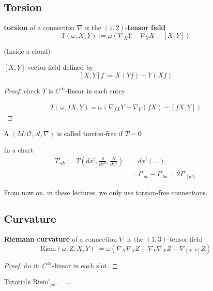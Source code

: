 \subsection{Torsion}

\begin{definition}
  \textbf{torsion} of a connection $\nabla$ is the $(1,2)$-\textbf{tensor field}
\begin{equation}
  T(\omega,X,Y) := \omega( \nabla_X Y - \nabla_Y X - [X,Y])
\end{equation}
\end{definition}

(Inside a cloud) 

$[X,Y]$ vector field defined by 
\[
[X,Y]f:= X(Yf) - Y(Xf)
\]

\begin{proof}
  check $T$ is $C^{\infty}$-linear in each entry

\[
\begin{gathered}
  T(\omega, fX,Y) = \omega ( \nabla_{fX} Y - \nabla_Y (fX) - [fX,Y] )
\end{gathered}
\]
\end{proof}

\begin{definition}
  A $(M, \mathcal{O}, \mathcal{A}, \nabla)$ is called torsion-free if $T=0$
\end{definition}

In a chart 
\[
\begin{aligned}
  T^i_{ \, \, ab } := T\left(dx^i , \frac{ \partial }{ \partial x^a} , \frac{ \partial }{ \partial x^b}  \right) & = dx^i ( \dots ) \\ 
  & = \Gamma^i_{ \, \, ab} - \Gamma^i_{ \, \, ba} = 2 \Gamma^i_{ \, \, [ab] }
\end{aligned}
\]

From now on, in these lectures, we only use torsion-free connections. 

\subsection{Curvature}

\begin{definition}
  \textbf{Riemann curvature} of a connection $\nabla$ is the $(1,3)$-tensor field
\begin{equation}
  \text{Riem}(\omega,Z,X,Y) := \omega( \nabla_X \nabla_Y Z - \nabla_Y \nabla_X Z - \nabla_{[X,Y]} Z)
\end{equation}
\end{definition}
\begin{proof}
  do it: $C^{\infty}$-linear in each slot.  
\end{proof}

\underline{Tutorials} $\text{Riem}^i_{ \,\, jab} = \dots $
